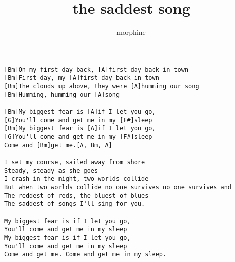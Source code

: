 \author{morphine}
\title{the saddest song}
\maketitle
\begin{verbatim}
[Bm]On my first day back, [A]first day back in town
[Bm]First day, my [A]first day back in town
[Bm]The clouds up above, they were [A]humming our song
[Bm]Humming, humming our [A]song

[Bm]My biggest fear is [A]if I let you go,
[G]You'll come and get me in my [F#]sleep
[Bm]My biggest fear is [A]if I let you go,
[G]You'll come and get me in my [F#]sleep
Come and [Bm]get me.[A, Bm, A]

I set my course, sailed away from shore
Steady, steady as she goes
I crash in the night, two worlds collide
But when two worlds collide no one survives no one survives and
The reddest of reds, the bluest of blues
The saddest of songs I'll sing for you.

My biggest fear is if I let you go,
You'll come and get me in my sleep
My biggest fear is if I let you go,
You'll come and get me in my sleep
Come and get me. Come and get me in my sleep.

\end{verbatim}
